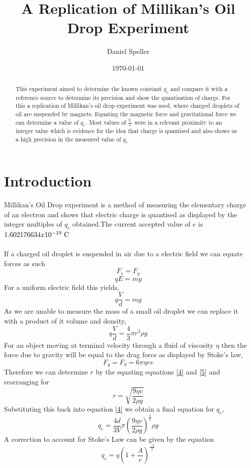 \documentclass{article}
\title{A Replication of Millikan's Oil Drop Experiment}
\author{Daniel Speller}
\affil{University of Leeds}
\date{\today}
\begin{document}
\maketitle
\begin{abstract}
    This experiment aimed to determine the known constant $q_e$ and compare it with a reference source to determine its precision and show the quantisation of charge. For this a replication of Millikan's oil drop experiment was used, where charged droplets of oil are suspended by magnets. Equating the magnetic force and gravitational force we can determine a value of $q_e$. Most values of $\frac{q_e}{e}$ were in a relevant proximity to an integer value which is evidence for the idea that charge is quantised and also shows us a high precision in the measured value of $q_e$
\end{abstract}
\section{Introduction}
Millikan's Oil Drop experiment is a method of measuring the elementary charge of an electron and shows that electric charge is quantised as displayed by the integer multiples of $q_e$ obtained.The current accepted value of $e$ is $1.602 176 634  x 10^{-19} \ \unit C$ \cite{codata}
\\\\
If a charged oil droplet is suspended in air due to a electric field we can equate forces as such
\begin{equation}\label{1}
    F_e=F_g
\end{equation}
\begin{equation}\label{2}
    qE=mg
\end{equation}
For a uniform electric field this yields,
\begin{equation}\label{3}
    q\frac{V}{d}=mg
\end{equation}
As we are unable to measure the mass of a small oil droplet we can replace it with a product of it volume and density,
\begin{equation}\label{4}
    q\frac{V}{d}=\frac{4}{3}\pi r^3\rho g
\end{equation}
For an object moving at terminal velocity through a fluid of viscosity $\eta$ then the force due to gravity will be equal to the drag force as displayed by Stoke's law,
\begin{equation}\label{5}
    F_g=F_d=6\pi \eta rv
\end{equation}
Therefore we can determine $r$ by the equating equations \ref{4} and \ref{5} and rearranging for
\begin{equation}
    r=\sqrt{\frac{9\eta v}{2\rho g}}
\end{equation}
Substituting this back into equation \ref{4} we obtain a final equation for $q_e$,
\begin{equation}
    q_e=\frac{4d}{3V}\pi\left(\frac{9\eta v}{2\rho g}\right)^{\frac{3}{2}} \rho g
\end{equation}
A correction to account for Stoke's Law can be given by the equation \cite{millikan_1913}
\begin{equation}
    q_c=q\left(1+\frac{A}{r}\right)^{\frac{-3}{2}}
\end{equation}
\end{document}

